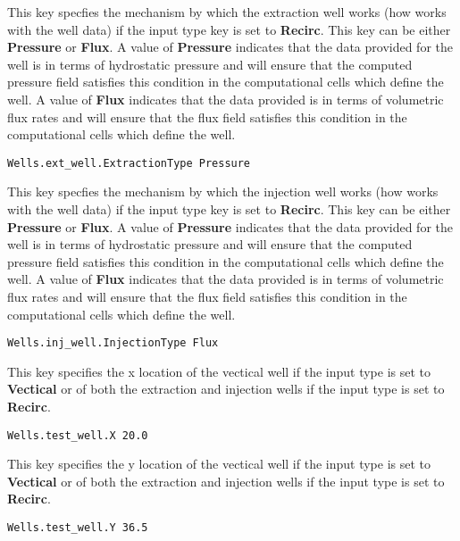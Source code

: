 {
This key specfies the mechanism by which the extraction well works (how
\parflow{} works with the well data) if the input type key is set to
{\bf Recirc}.  This key can be either {\bf Pressure} or {\bf Flux}.  A
value of {\bf Pressure} indicates that the data provided for the well is
in terms of hydrostatic pressure and \parflow{} will ensure that the
computed pressure field satisfies this condition in the computational
cells which define the well.  A value of {\bf Flux} indicates that the
data provided is in terms of volumetric flux rates and \parflow{} will
ensure that the flux field satisfies this condition in the computational
cells which define the well.
}
\begin{display}\begin{verbatim}
Wells.ext_well.ExtractionType Pressure
\end{verbatim}\end{display}

{
This key specfies the mechanism by which the injection well works (how
\parflow{} works with the well data) if the input type key is set to
{\bf Recirc}.  This key can be either {\bf Pressure} or {\bf Flux}.  A
value of {\bf Pressure} indicates that the data provided for the well is
in terms of hydrostatic pressure and \parflow{} will ensure that the
computed pressure field satisfies this condition in the computational
cells which define the well.  A value of {\bf Flux} indicates that the
data provided is in terms of volumetric flux rates and \parflow{} will
ensure that the flux field satisfies this condition in the computational
cells which define the well.
}
\begin{display}\begin{verbatim}
Wells.inj_well.InjectionType Flux
\end{verbatim}\end{display}

{
This key specifies the x location of the vectical well if the input
type is set to {\bf Vectical} or of both the extraction and injection
wells if the input type is set to {\bf Recirc}.
}
\begin{display}\begin{verbatim}
Wells.test_well.X 20.0
\end{verbatim}\end{display}

{
This key specifies the y location of the vectical well if the input
type is set to {\bf Vectical} or of both the extraction and injection
wells if the input type is set  to {\bf Recirc}.
}
\begin{display}\begin{verbatim}
Wells.test_well.Y 36.5
\end{verbatim}\end{display}

